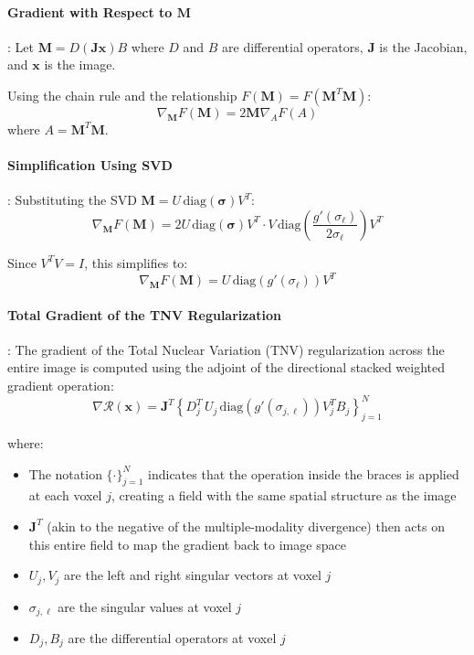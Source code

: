 \paragraph{Gradient with Respect to $\mathbf{M}$}:
Let $\mathbf{M} = D(\mathbf{J}\mathbf{x})B$ where $D$ and $B$ are differential operators, $\mathbf{J}$ is the Jacobian, and $\mathbf{x}$ is the image.

Using the chain rule and the relationship $F(\mathbf{M}) = F(\mathbf{M}^T\mathbf{M})$:
\[
\nabla_{\mathbf{M}} F(\mathbf{M}) = 2\mathbf{M} \nabla_A F(A)
\]
where $A = \mathbf{M}^T\mathbf{M}$.

\paragraph{Simplification Using SVD}:
Substituting the SVD $\mathbf{M} = U \,\text{diag}(\boldsymbol{\sigma}) V^T$:
\[
\nabla_{\mathbf{M}} F(\mathbf{M}) = 2 U \,\text{diag}(\boldsymbol{\sigma}) V^T \cdot V \,\text{diag}\left(\frac{g'(\sigma_\ell)}{2\sigma_\ell}\right) V^T
\]

Since $V^T V = I$, this simplifies to:
\[
\nabla_{\mathbf{M}} F(\mathbf{M}) = U \,\text{diag}(g'(\sigma_\ell)) V^T
\]

\paragraph{Total Gradient of the TNV Regularization}:
The gradient of the Total Nuclear Variation (TNV) regularization across the entire image is computed using the adjoint of the directional stacked weighted gradient operation:
\[
\nabla \mathcal{R}(\mathbf{x}) = \mathbf{J}^T \left\{D_j^T \, U_j \,\text{diag}(g'(\sigma_{j,\ell})) V_j^T B_j\right\}_{j=1}^N
\]

where:
\begin{itemize}
\item The notation $\{\cdot\}_{j=1}^N$ indicates that the operation inside the braces is applied at each voxel $j$, creating a field with the same spatial structure as the image
\item $\mathbf{J}^T$ (akin to the negative of the multiple-modality divergence) then acts on this entire field to map the gradient back to image space
\item $U_j, V_j$ are the left and right singular vectors at voxel $j$
\item $\sigma_{j,\ell}$ are the singular values at voxel $j$
\item $D_j, B_j$ are the differential operators at voxel $j$
\end{itemize}

